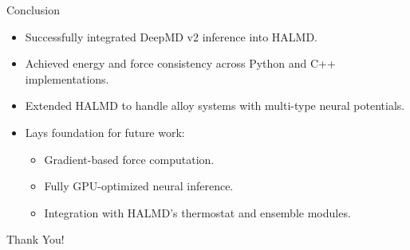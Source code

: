 \documentclass[aspectratio=169]{beamer}
\begin{document}
\begin{frame}{Conclusion}
\begin{itemize}
    \item Successfully integrated DeepMD v2 inference into HALMD.
    \item Achieved energy and force consistency across Python and C++ implementations.
    \item Extended HALMD to handle alloy systems with multi-type neural potentials.
    \item Lays foundation for future work:
    \begin{itemize}
        \item Gradient-based force computation.
        \item Fully GPU-optimized neural inference.
        \item Integration with HALMD’s thermostat and ensemble modules.
    \end{itemize}
\end{itemize}
\end{frame}

\begin{frame}
\centering
\Huge Thank You!
\end{frame}
\end{document}
